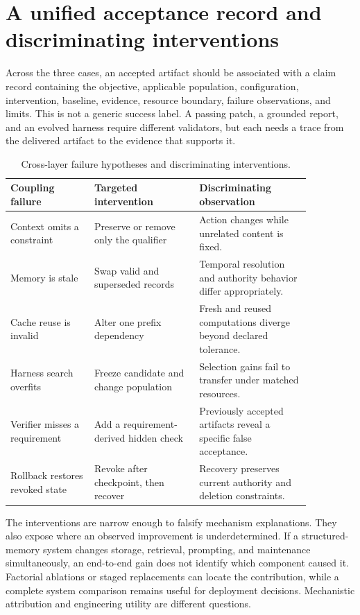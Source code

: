 \section{A unified acceptance record and discriminating interventions}\label{sec:C33:07}
Across the three cases, an accepted artifact should be associated with a claim record containing the objective, applicable population, configuration, intervention, baseline, evidence, resource boundary, failure observations, and limits. This is not a generic success label. A passing patch, a grounded report, and an evolved harness require different validators, but each needs a trace from the delivered artifact to the evidence that supports it.

\begin{table}[!htbp]
\centering
\caption{Cross-layer failure hypotheses and discriminating interventions.}\label{tab:C33:interventions}
\begin{tabular}{L{0.24\linewidth}L{0.30\linewidth}L{0.32\linewidth}}

\toprule Coupling failure & Targeted intervention & Discriminating observation\\\midrule
Context omits a constraint & Preserve or remove only the qualifier & Action changes while unrelated content is fixed.\\
Memory is stale & Swap valid and superseded records & Temporal resolution and authority behavior differ appropriately.\\
Cache reuse is invalid & Alter one prefix dependency & Fresh and reused computations diverge beyond declared tolerance.\\
Harness search overfits & Freeze candidate and change population & Selection gains fail to transfer under matched resources.\\
Verifier misses a requirement & Add a requirement-derived hidden check & Previously accepted artifacts reveal a specific false acceptance.\\
Rollback restores revoked state & Revoke after checkpoint, then recover & Recovery preserves current authority and deletion constraints.\\
\bottomrule
\end{tabular}
\end{table}

The interventions are narrow enough to falsify mechanism explanations. They also expose where an observed improvement is underdetermined. If a structured-memory system changes storage, retrieval, prompting, and maintenance simultaneously, an end-to-end gain does not identify which component caused it. Factorial ablations or staged replacements can locate the contribution, while a complete system comparison remains useful for deployment decisions. Mechanistic attribution and engineering utility are different questions.


